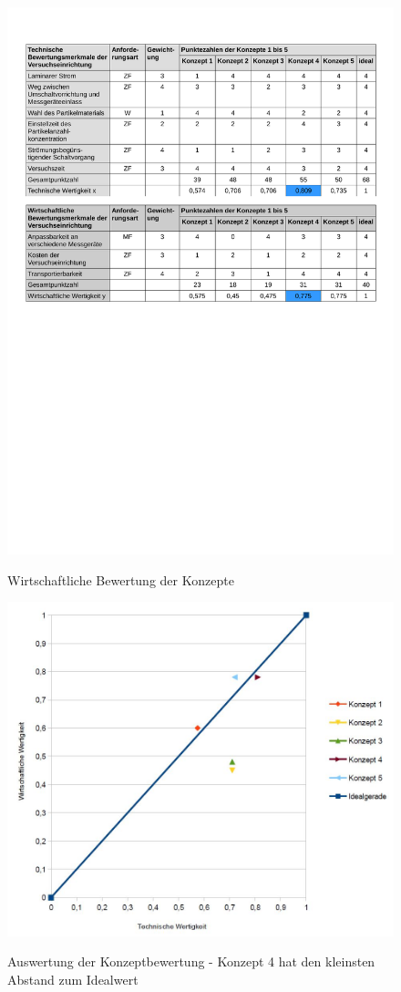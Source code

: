 \begin{figure}[H]
        \myfloatalign
        {\includegraphics[width=.8\linewidth]{gfx/conclusion/TabEvalThree.pdf}} \quad
        \caption[Wirtschaftliche Bewertung der Konzepte]
        {Wirtschaftliche Bewertung der Konzepte}
        \label{fig:TabEvalOne}
\end{figure}
\begin{figure}[H]
        \myfloatalign
        {\includegraphics[width=.6\linewidth]{gfx/conclusion/s_diagram.jpg}} \quad
        \caption[Auswertung der Konzeptbewertung - Konzept 4 hat den kleinsten Abstand zum Idealwert]
        {Auswertung der Konzeptbewertung - Konzept 4 hat den kleinsten Abstand zum Idealwert}
        \label{fig:TabEvalOne}
\end{figure}